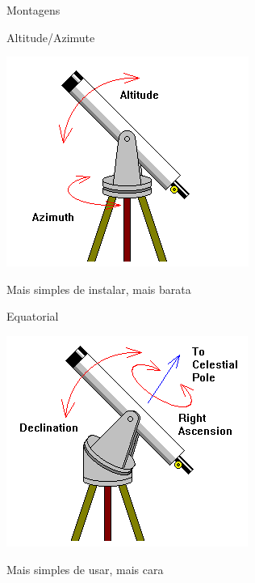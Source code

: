 \documentclass[beamer,9pt,aspectratio=169]{beamer}
\begin{document}
\begin{frame}{Montagens}
  \begin{minipage}[t]{0.49\linewidth}
    \begin{center}
      Altitude/Azimute
      
      \vspace{2em}
      \includegraphics[width=0.7\linewidth]{figs/mounts_altaz.png}

      \vspace{1em}
      {Mais simples de instalar, mais barata}
    \end{center}
  \end{minipage}\hfill
  \pause
   \begin{minipage}[t]{0.49\linewidth}
    \begin{center}
      Equatorial
      
      \vspace{2em}
      \includegraphics[width=0.7\linewidth]{figs/mounts_equat.png}

      \vspace{1em}
      {Mais simples de usar, mais cara}
    \end{center}
  \end{minipage}
\end{frame}
\end{document}
